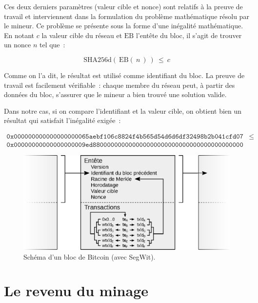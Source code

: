 Ces deux derniers paramètres (valeur cible et nonce) sont relatifs à la preuve de travail et interviennent dans la formulation du problème mathématique résolu par le mineur. Ce problème se présente sous la forme d'une inégalité mathématique. En notant $c$ la valeur cible du réseau et $\mathrm{EB}$ l'entête du bloc, il s'agit de trouver un nonce $n$ tel que~:

{ \small
\[
\mathrm{SHA256d} ( \ \mathrm{EB} ( \ n \ ) \ ) ~ \le ~ c
\]
}

Comme on l'a dit, le résultat est utilisé comme identifiant du bloc. La preuve de travail est facilement vérifiable~: chaque membre du réseau peut, à partir des données du bloc, s'assurer que le mineur a bien trouvé une solution valide. %

Dans notre cas, si on compare l'identifiant et la valeur cible, on obtient bien un résultat qui satisfait l'inégalité exigée~: 

{ \footnotesize
\begin{align*}
\mathtt{0x000000000000000000065aebf106c8824f4b565d54d6d6df32498b2b041cfd07} & \le \\ \mathtt{0x00000000000000000009ed880000000000000000000000000000000000000000} & ~
\end{align*}
}

\begin{figure}[h]
  \centering
  \includegraphics[scale=0.75]{img/bitcoin-segwit-block.eps}
  \caption{Schéma d'un bloc de Bitcoin (avec SegWit).}
  \label{fig:bitcoin-segwit-block}
\end{figure}

\section*{Le revenu du minage} %


